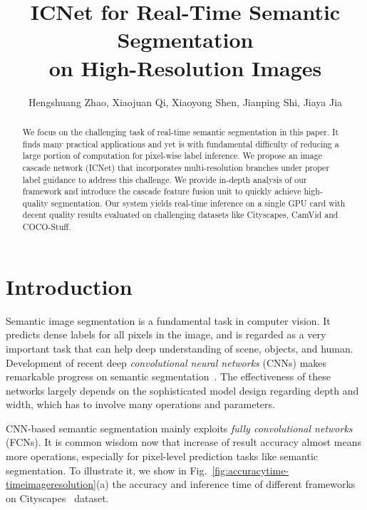 \documentclass[runningheads]{llncs}
\begin{document}
\title{ICNet for Real-Time Semantic Segmentation\\ on High-Resolution Images}


\author{Hengshuang Zhao, Xiaojuan Qi, Xiaoyong Shen, Jianping Shi, Jiaya Jia}



\maketitle              \setcounter{footnote}{-1}
\begin{abstract}
We focus on the challenging task of real-time semantic segmentation in this paper. It finds many practical applications and yet is with fundamental difficulty of reducing a large portion of computation for pixel-wise label inference. We propose an image cascade network (ICNet) that incorporates multi-resolution branches under proper label guidance to address this challenge. We provide in-depth analysis of our framework and introduce the cascade feature fusion unit to quickly achieve high-quality segmentation. Our system yields real-time inference on a single GPU card with decent quality results evaluated on challenging datasets like Cityscapes, CamVid and COCO-Stuff.
\end{abstract}
\section{Introduction}
Semantic image segmentation is a fundamental task in computer vision. It predicts dense labels for all pixels in the image, and is regarded as a very important task that can help deep understanding of scene, objects, and human. Development of recent deep {\it convolutional neural networks} (CNNs) makes remarkable progress on semantic segmentation~\cite{long2015fully,chen2015semantic,badrinarayanan2015segnet,noh2015learning,zhao2017pspnet,wu2016wider}. The effectiveness of these networks largely depends on the sophisticated model design regarding depth and width, which has to involve many operations and parameters.

CNN-based semantic segmentation mainly exploits \textit{fully convolutional networks} (FCNs). It is common wisdom now that increase of result accuracy almost means more operations, especially for pixel-level prediction tasks like semantic segmentation. To illustrate it, we show in Fig.~\ref{fig:accuracytime-timeimageresolution}(a) the accuracy and inference time of different frameworks on Cityscapes~\cite{cordts2016cityscapes} dataset.
\end{document}
